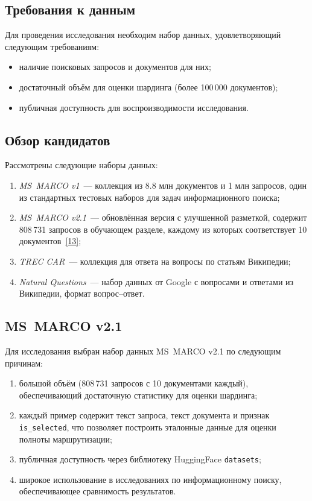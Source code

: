 \documentclass[14pt, a4paper]{article}
\newcommand{\srcref}[1]{\hyperlink{src:i#1}{[#1]}}
\begin{document}
	\subsection{Требования к данным}

	Для проведения исследования необходим набор данных, удовлетворяющий следующим требованиям:
	\begin{itemize}
		\item наличие поисковых запросов и документов для них;
		\item достаточный объём для оценки шардинга (более 100\,000 документов);
		\item публичная доступность для воспроизводимости исследования.
	\end{itemize}

	\subsection{Обзор кандидатов}

	Рассмотрены следующие наборы данных:
	\begin{enumerate}
		\item \textit{MS~MARCO v1}~--- коллекция из 8.8 млн документов и 1 млн запросов, один из стандартных тестовых наборов для задач информационного поиска;
		\item \textit{MS~MARCO v2.1}~--- обновлённая версия с улучшенной разметкой, содержит 808\,731 запросов в обучающем разделе, каждому из которых соответствует 10 документов~\srcref{13};
		\item \textit{TREC CAR}~--- коллекция для ответа на вопросы по статьям Википедии;
		\item \textit{Natural Questions}~--- набор данных от Google с вопросами и ответами из Википедии, формат вопрос--ответ.
	\end{enumerate}

	\subsection{MS~MARCO v2.1}

	Для исследования выбран набор данных MS~MARCO v2.1 по следующим причинам:
	\begin{enumerate}
		\item большой объём (808\,731 запросов с 10 документами каждый), обеспечивающий достаточную статистику для оценки шардинга;
		\item каждый пример содержит текст запроса, текст документа и признак \texttt{is\_selected}, что позволяет построить эталонные данные для оценки полноты маршрутизации;
		\item публичная доступность через библиотеку HuggingFace \texttt{datasets};
		\item широкое использование в исследованиях по информационному поиску, обеспечивающее сравнимость результатов.
	\end{enumerate}
\end{document}
